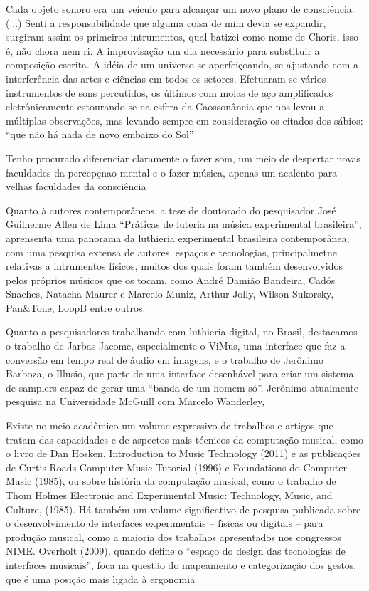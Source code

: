 Cada objeto sonoro era um veículo para alcançar um novo plano de consciência. (...) Senti a responsabilidade que alguma coisa de mim devia se expandir, surgiram assim os primeiros intrumentos, qual batizei como nome de Choris, isso é, não chora nem ri. A improvisação um dia necessário para substituir a composição escrita. A idéia de um universo se aperfeiçoando, se ajustando com a interferência das artes e ciências em todos os setores. Efetuaram-se vários instrumentos de sons percutidos, os últimos com molas de aço amplificados eletrônicamente estourando-se na esfera da Caossonância que nos levou a múltiplas observações, mas levando sempre em consideração os citados dos sábios: ``que não há nada de novo embaixo do Sol''

Tenho procurado diferenciar claramente o fazer som, um meio de despertar novas faculdades da percepçnao mental e o fazer música, apenas um acalento para velhas faculdades da consciência

Quanto à autores contemporâneos, a tese de doutorado do pesquisador José Guilherme Allen de Lima \cite{Lima2018} ``Práticas de luteria na música experimental brasileira'', aprensenta uma panorama da luthieria experimental brasileira contemporânea, com uma pesquisa extensa de autores, espaços e tecnologias, principalmetne relativas a intrumentos físicos, muitos dos quais foram também desenvolvidos pelos próprios músicos que os tocam, como André Damião Bandeira, Cadós Snaches, Natacha Maurer e Marcelo Muniz, Arthur Jolly, Wilson Sukorsky, Pan\&Tone, LoopB entre outros. 

Quanto a pesquisadores trabalhando com luthieria digital, no Brasil, destacamos o trabalho de Jarbas Jacome, especialmente o ViMus, uma interface que faz a conversão em tempo real de áudio em imagens, e o trabalho de Jerônimo Barboza, o Illusio, que parte de uma interface desenhável para criar um sistema de samplers capaz de gerar uma ``banda de um homem só''. Jerônimo atualmente pesquisa na Universidade McGuill com Marcelo Wanderley, 






Existe no meio acadêmico um volume expressivo de trabalhos e artigos que tratam das capacidades e de aspectos mais técnicos da computação musical, como o livro de Dan Hosken, Introduction to Music Technology (2011) e as publicações de Curtis Roads Computer Music Tutorial (1996) e Foundations do Computer Music (1985), ou sobre história da computação musical, como o trabalho de Thom Holmes Electronic and Experimental Music: Technology, Music, and Culture, (1985). Há também um volume significativo de pesquisa publicada sobre o desenvolvimento de interfaces experimentais – físicas ou digitais – para produção musical, como a maioria dos trabalhos apresentados nos congressos NIME. Overholt (2009), quando define o ``espaço do design das tecnologias de interfaces musicais'', foca na questão do mapeamento e categorização dos gestos, que é uma posição mais ligada à ergonomia



